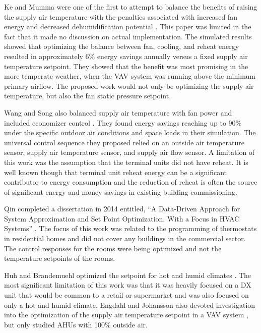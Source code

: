 Ke and Mumma were one of the first to attempt to balance the benefits of
raising the supply air temperature with the penalties associated with
increased fan energy and decreased dehumidification potential
\cite{Ke1997OptimizedSystems}. This paper was limited in the fact that
it made no discussion on actual implementation. The simulated results
showed that optimizing the balance between fan, cooling, and reheat
energy resulted in approximately 6\% energy savings annually versus a
fixed supply air temperature setpoint. They showed that the benefit was
most promising in the more temperate weather, when the VAV system was
running above the minimum primary airflow. The proposed work would not only
be optimizing the supply air temperature, but also the fan static pressure setpoint.   

Wang and Song also balanced supply air temperature with fan power and
included economizer control \cite{Wang2012AirCycles}. They found energy
savings reaching up to 90\% under the specific outdoor air conditions
and space loads in their simulation. The universal control sequence they
proposed relied on an outside air temperature sensor, supply air
temperature sensor, and supply air flow sensor. A limitation of this
work was the assumption that the terminal units did not have reheat. It
is well known though that terminal unit reheat energy can be a
significant contributor to energy consumption and the reduction of
reheat is often the source of significant energy and money savings in
existing building commissioning.  

Qin completed a dissertation in 2014 entitled, ``A Data-Driven Approach
for System Approximation and Set Point Optimization, With a Focus in
HVAC Systems'' \cite{Qin_2014_Res_Letters}. The focus of this work was
related to the programming of thermostats in residential homes and did
not cover any buildings in the commercial sector. The control responses
for the rooms were being optimized and not the temperature setpoints of
the rooms.  

Huh and Brandemuehl optimized the setpoint for hot and humid climates
\cite{Huh2008}. The most significant limitation of this work was that it
was heavily focused on a DX unit that would be common to a retail or
supermarket and was also focused on only a hot and humid climate.
Engdahl and Johansson also devoted investigation into the optimization
of the supply air temperature setpoint in a VAV system
\cite{Engdahl2004}, but only studied AHUs with 100\% outside air. 

